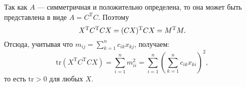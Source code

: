 \documentclass{article}
\begin{document}
Так как $A$ --- симметричная и положительно определена, то она может быть представлена в виде $A=C^{\mathrm{T}}C$. Поэтому
$$
X^{\mathrm{T}}C^{\mathrm{T}}CX=(CX)^{\mathrm{T}}CX=M^{\mathrm{T}}M.\\
$$
Отсюда, учитывая что $m_{ij}=\sum\limits_{k=1}^{n}c_{ik}x_{kj}$, получаем:
$$
\mathrm{tr}(X^{\mathrm{T}}C^{\mathrm{T}}CX)=\sum\limits_{i=1}^{n}m_{ii}^2=\sum\limits_{i=1}^{n}(\sum\limits_{k=1}^{n}c_{ik}x_{ki})^2,
$$
то есть $\mathrm{tr}>0$ для любых $X$.
\end{document}
